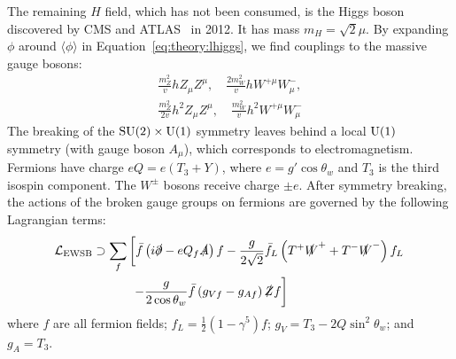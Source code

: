 The remaining $H$ field, which has not been consumed, is the Higgs boson discovered by CMS and ATLAS~\cite{higgsdisc} in 2012.
It has mass $m_H = \sqrt2\mu$.
By expanding $\phi$ around $\langle \phi \rangle$ in Equation~\ref{eq:theory:lhiggs}, we find couplings to the massive gauge bosons:
\begin{gather}
    \frac{m_Z^2}{v} hZ_\mu Z^\mu, \quad \frac{2m_W^2}{v}hW^{+\mu} W^{-}_\mu, \nonumber \\
    \frac{m_Z^2}{2v} h^2 Z_\mu Z^\mu, \quad \frac{m_W^2}{v} h^2 W^{+\mu} W^-_\mu 
\end{gather}
The breaking of the $\operatorname{\mathrm{SU}}(2)\times \operatorname{\mathrm{U}}(1)$ symmetry leaves behind a local $\operatorname{\mathrm{U}}(1)$ symmetry (with gauge boson $A_\mu$), which corresponds to electromagnetism.
Fermions have charge $eQ = e(T_3+Y)$, where $e=g'\cos\theta_w$ and $T_3$ is the third isospin component. 
The $W^\pm$ bosons receive charge $\pm e$.
After symmetry breaking, the actions of the broken gauge groups on fermions are governed by the following Lagrangian terms:
\begin{align}
    \mathcal{L}_\mathrm{EWSB} \supset 
            \sum_f &\left[\bar f\left(i\slashed\partial-eQ_f\slashed A\right) f 
            - \frac{g}{2\sqrt{2}} \bar f_L \left(T^+\slashed W^+ + T^- \slashed W^-\right) f_L\right. \nonumber \\
            &\left.~- \frac{g}{2\cos\theta_w} \bar f\left(g_{Vf} - g_{Af} \right)\slashed Z f \right]
\end{align}
where $f$ are all fermion fields; $f_L = \frac{1}{2}(1-\gamma^5)f$; $g_{V} = T_3- 2Q\sin^2\theta_w$; and $g_{A} = T_3$.

